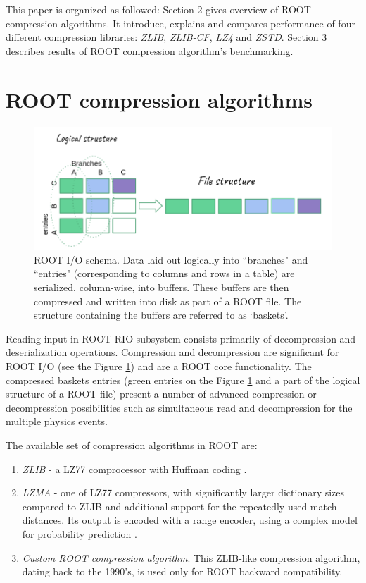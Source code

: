\documentclass[12pt]{iopart}
\begin{document}
This paper is organized as followed: Section 2 gives overview of ROOT compression algorithms. It introduce, explains and compares performance of four different compression libraries: \textit{ZLIB}, \textit{ZLIB-CF}, \textit{LZ4} and \textit{ZSTD}. Section 3 describes results of ROOT compression algorithm's benchmarking.

\section{ROOT compression algorithms}

\begin{figure}[h]
\centering
\includegraphics[width=0.8\linewidth]{rootio1.png}
\caption{ROOT I/O schema.  Data laid out logically into ``branches" and ``entries" (corresponding to columns and rows in a table) are serialized, column-wise, into buffers.  These buffers are then compressed and written into disk as part of a ROOT file.  The structure containing the buffers are referred to as `baskets'.}
\label{fig:rootio}
\end{figure}

Reading input in ROOT RIO subsystem consists primarily of decompression and deserialization operations. Compression and decompression are significant for ROOT I/O (see the Figure \ref{fig:rootio}) and are a ROOT core functionality.   The compressed baskets entries (green entries on the Figure \ref{fig:rootio} and a part of the logical structure of a ROOT file) present a number of advanced compression or decompression possibilities such as simultaneous read and decompression for the multiple physics events.

The available set of compression algorithms in ROOT are:
\begin{enumerate}
    \item \textit{ZLIB} - a LZ77 comprocessor with Huffman coding \cite{zlib}.
    \item \textit{LZMA} - one of LZ77 compressors, with significantly larger dictionary sizes compared to ZLIB and additional support for the repeatedly used match distances. Its output is encoded with a range encoder, using a complex model for probability prediction \cite{lzma}.
    \item \textit{Custom ROOT compression algorithm}.  This ZLIB-like compression algorithm, dating back to the 1990's, is used only for ROOT backward compatibility.
\end{enumerate}
\end{document}
